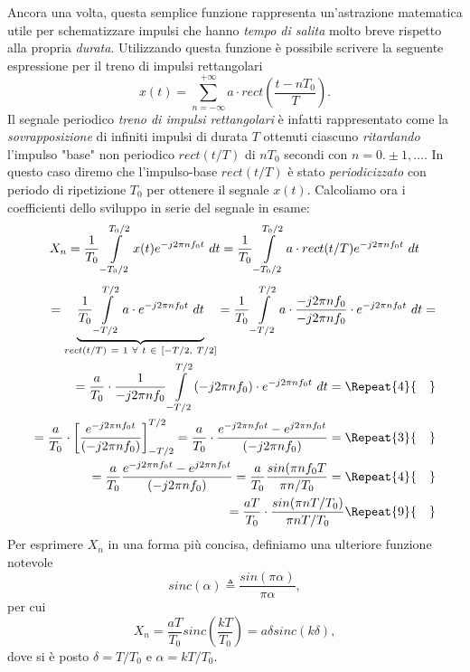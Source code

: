 \documentclass[12pt,oneside,openany]{memoir}
\numberwithin{equation}{subsection}
\newcommand{\quads}[1]{\Repeat{#1}{\quad}}
\newcommand{\dt}{\ dt}
\begin{document}
Ancora una volta, questa semplice funzione rappresenta un'astrazione matematica
utile per schematizzare impulsi che hanno \textit{tempo di salita} molto breve
rispetto alla propria \textit{durata}. Utilizzando questa funzione \`e possibile
scrivere la seguente espressione per il treno di impulsi rettangolari
\begin{equation}
	x(t) = \sum_{n = -\infty}^{+\infty} a \cdot rect\left(\frac{t - nT_0}{T}
	\right).
\end{equation}
Il segnale periodico \textit{treno di impulsi rettangolari} \`e infatti
rappresentato come la \textit{sovrapposizione} di infiniti impulsi di durata $T$
ottenuti ciascuno \textit{ritardando} l'impulso "base" non periodico $rect(t/T)$
di $nT_0$ secondi con $n = 0. \pm1,\dots$. In questo caso diremo che
l'impulso-base $rect(t/T)$ \`e stato \textit{periodicizzato} con periodo di
ripetizione $T_0$ per ottenere il segnale $x(t)$.
\bigbreak
Calcoliamo ora i coefficienti dello sviluppo in serie del segnale in esame:
\[
	X_n = \frac{1}{T_0} \int\displaylimits_{-T_0/2}^{T_0/2} x(t)
	e^{-j 2 \pi n f_0 t} \dt = \frac{1}{T_0}
	\int\displaylimits_{-T_0/2}^{T_0/2} a \cdot rect(t/T)
	e^{-j 2 \pi n f_0 t} \dt
\]
\begin{equation}
	\begin{split}
		= \underbrace{\frac{1}{T_0} \int\displaylimits_{-T/2}^{T/2} a
		\cdot e^{-j 2 \pi n f_0 t} \dt}_{rect(t/T) \ = \ 1 \ \forall \ 
		t \ \in \ [-T/2, \ T/2]} = \frac{1}{T_0}
		\int\displaylimits_{-T/2}^{T/2} a \cdot
		\frac{-j 2 \pi n f_0}{-j 2 \pi n f_0} \cdot e^{-j 2 \pi n f_0 t}
		\dt =
		\\
		= \frac{a}{T_0} \cdot \frac{1}{-j 2 \pi n f_0}
		\int\displaylimits_{-T/2}^{T/2} (-j 2 \pi n f_0) \cdot
		e^{-j 2 \pi n f_0 t} \dt =
		\quads{4}
		\\
		= \frac{a}{T_0} \cdot \left[
			\frac{e^{-j 2 \pi n f_0 t}}{(-j 2 \pi n f_0)}
		\right]_{-T/2}^{T/2} = \frac{a}{T_0} \cdot
		\frac{e^{-j 2 \pi n f_0 t} - e^{j 2 \pi n f_0 t}}{(-j 2 \pi n f_0)} =
		\quads{3}
		\\
		= \frac{a}{T_0} \frac{e^{-j 2 \pi n f_0 t} - e^{j 2 \pi n f_0 t}}{(-j 2 \pi n f_0)}
		= \frac{a}{T_0} \frac{sin(\pi n f_0 T}{\pi n / T_0} =
		\quads{4}
		\\
		= \frac{a T}{T_0} \cdot \frac{sin(\pi n T/T_0)}{\pi n T/T_0}
		\quads{9}
		\\
	\end{split}
\end{equation}
Per esprimere $X_n$ in una forma pi\`u concisa, definiamo una ulteriore funzione
notevole
\begin{equation}
	sinc(\alpha) \triangleq \frac{sin(\pi \alpha)}{\pi \alpha},
\end{equation}
per cui
\begin{equation}
	X_n = \frac{aT}{T_0} sinc(\frac{kT}{T_0}) = a \delta sinc(k \delta),
\end{equation}
dove si \`e posto $\delta = T/T_0$ e $\alpha = kT/T_0$.
\end{document}
